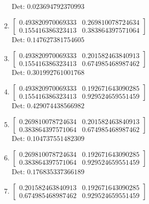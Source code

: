 \documentclass[12pt]{article}
\begin{document}
\begin{enumerate}
Det: $0.023694792370993$\\

\item $\displaystyle \left[\begin{matrix}0.493820970069333 & 0.269810078724634\\0.155416386323413 & 0.383864397571064\end{matrix}\right]$\\

Det: $0.147627381754605$\\

\item $\displaystyle \left[\begin{matrix}0.493820970069333 & 0.201582463840913\\0.155416386323413 & 0.674985468987462\end{matrix}\right]$\\

Det: $0.301992761001768$\\

\item $\displaystyle \left[\begin{matrix}0.493820970069333 & 0.192671643090285\\0.155416386323413 & 0.929524659551459\end{matrix}\right]$\\

Det: $0.429074438566982$\\

\item $\displaystyle \left[\begin{matrix}0.269810078724634 & 0.201582463840913\\0.383864397571064 & 0.674985468987462\end{matrix}\right]$\\

Det: $0.104737551482309$\\

\item $\displaystyle \left[\begin{matrix}0.269810078724634 & 0.192671643090285\\0.383864397571064 & 0.929524659551459\end{matrix}\right]$\\

Det: $0.176835337366189$\\

\item $\displaystyle \left[\begin{matrix}0.201582463840913 & 0.192671643090285\\0.674985468987462 & 0.929524659551459\end{matrix}\right]$\\


\end{enumerate}
\end{document}
